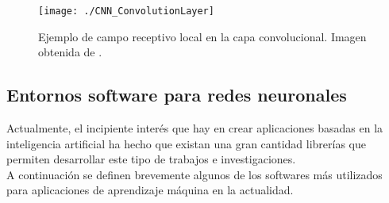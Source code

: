 \documentclass[a4paper, 12pt, spanish, chapterprefix, numbers=noenddot]{book}
\begin{document}
\begin{figure}[H]
\begin{center}
\texttt{[image: ./CNN\_ConvolutionLayer]}
\caption{Ejemplo de campo receptivo local en la capa convolucional. Imagen obtenida de \cite{CNN}.}
\label{CNN_ConvolutionLayer}
\end{center}
\end{figure}

\subsection{Entornos software para redes neuronales}\label{SoftwaresRNN}

Actualmente, el incipiente interés que hay en crear aplicaciones basadas en la inteligencia artificial ha hecho que existan una gran cantidad librerías que permiten desarrollar este tipo de trabajos e investigaciones.\\

A continuación se definen brevemente algunos de los softwares más utilizados para aplicaciones de aprendizaje máquina en la actualidad.
\end{document}
